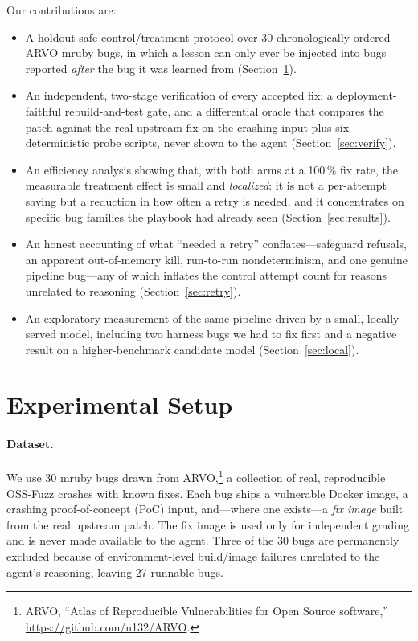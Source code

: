 \documentclass[11pt]{article}
\begin{document}
Our contributions are:
\begin{itemize}
  \item A holdout-safe control/treatment protocol over 30 chronologically ordered
  ARVO mruby bugs, in which a lesson can only ever be injected into bugs reported
  \emph{after} the bug it was learned from (Section~\ref{sec:method}).
  \item An independent, two-stage verification of every accepted fix: a
  deployment-faithful rebuild-and-test gate, and a differential oracle that
  compares the patch against the real upstream fix on the crashing input plus six
  deterministic probe scripts, never shown to the agent (Section~\ref{sec:verify}).
  \item An efficiency analysis showing that, with both arms at a 100\,\% fix rate,
  the measurable treatment effect is small and \emph{localized}: it is not a
  per-attempt saving but a reduction in how often a retry is needed, and it
  concentrates on specific bug families the playbook had already seen
  (Section~\ref{sec:results}).
  \item An honest accounting of what ``needed a retry'' conflates---safeguard
  refusals, an apparent out-of-memory kill, run-to-run nondeterminism, and one
  genuine pipeline bug---any of which inflates the control attempt count for
  reasons unrelated to reasoning (Section~\ref{sec:retry}).
  \item An exploratory measurement of the same pipeline driven by a small,
  locally served model, including two harness bugs we had to fix first and a
  negative result on a higher-benchmark candidate model (Section~\ref{sec:local}).
\end{itemize}

\section{Experimental Setup}
\label{sec:method}

\paragraph{Dataset.} We use 30 mruby bugs drawn from ARVO,\footnote{ARVO,
``Atlas of Reproducible Vulnerabilities for Open Source software,''
\url{https://github.com/n132/ARVO}.} a collection of real, reproducible OSS-Fuzz
crashes with known fixes. Each bug ships a vulnerable Docker image, a crashing
proof-of-concept (PoC) input, and---where one exists---a \emph{fix image} built
from the real upstream patch. The fix image is used only for independent grading
and is never made available to the agent. Three of the 30 bugs are permanently
excluded because of environment-level build/image failures unrelated to the
agent's reasoning, leaving 27 runnable bugs.
\end{document}
